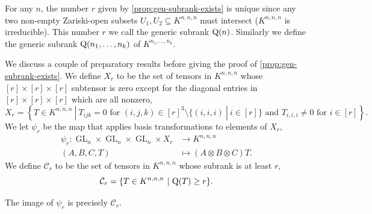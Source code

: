 \documentclass[10pt,a4paper]{article}
\theoremstyle{definition}
\theoremstyle{remark}
\newcommand{\subrank}{{\rm Q}}
\newcommand{\GL}{\operatorname{GL}}
\begin{document}
For any $n$, the number $r$ given by \autoref{prop:gen-subrank-exists} is unique since any two non-empty Zariski-open subsets $U_1, U_2 \subseteq K^{n,n,n}$ must intersect ($K^{n,n,n}$ is irreducible). This number $r$ we call the generic subrank $\subrank(n)$. Similarly we define the generic subrank $\subrank(n_1, \ldots, n_k)$ of $K^{n_1, \ldots, n_k}$.

%
%

%


%
We discuss a couple of preparatory results before giving the proof of \autoref{prop:gen-subrank-exists}. We define $X_r$ to be the set of tensors in $K^{n,n,n}$ whose $[r]\times[r]\times[r]$ subtensor is zero except for the diagonal entries in $[r]\times [r]\times [r]$ which are all nonzero,
\[
X_r = \left\{T \in K^{n,n,n}\ | \ T_{ijk} = 0 \text{ for } (i,j,k) \in [r]^3 \setminus \{(i,i,i)\ |\ i \in [r]\} \text{ and } T_{i,i,i} \neq 0 \text{ for } i \in [r] \right\}.
\]
We let $\psi_r$ be the map that applies basis transformations to elements of $X_r$,
\begin{align*}
\psi_r: \GL_n \times \GL_n \times \GL_n \times X_r &\longrightarrow K^{n,n,n}\\
(A,B,C,T) & \longmapsto (A \otimes B \otimes C)T.
\end{align*}
%
We define $\mathcal{C}_r$ to be the set of tensors in $K^{n,n,n}$ whose subrank is at least $r$,
%
\[
\mathcal{C}_r = \{T \in K^{n,n,n}\ | \ \subrank(T) \geq r\}.
\]


\begin{lemma} \label{lem:Cr-as-image}
The image of $\psi_r$ is precisely $\mathcal{C}_r$.
\end{lemma}
\end{document}
